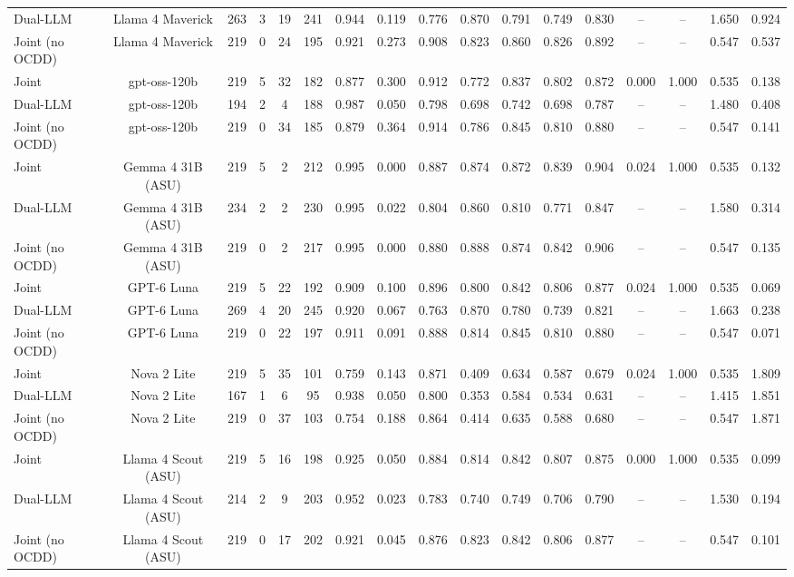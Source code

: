 \begin{table}[htbp]
\begin{tabular}{lcccccccccccccccc}
Dual-LLM & Llama 4 Maverick & 263 & 3 & 19 & 241 & 0.944 & 0.119 & 0.776 & 0.870 & 0.791 & 0.749 & 0.830 & -- & -- & 1.650 & 0.924 \\
Joint (no OCDD) & Llama 4 Maverick & 219 & 0 & 24 & 195 & 0.921 & 0.273 & 0.908 & 0.823 & 0.860 & 0.826 & 0.892 & -- & -- & 0.547 & 0.537 \\
Joint & gpt-oss-120b & 219 & 5 & 32 & 182 & 0.877 & 0.300 & 0.912 & 0.772 & 0.837 & 0.802 & 0.872 & 0.000 & 1.000 & 0.535 & 0.138 \\
Dual-LLM & gpt-oss-120b & 194 & 2 & 4 & 188 & 0.987 & 0.050 & 0.798 & 0.698 & 0.742 & 0.698 & 0.787 & -- & -- & 1.480 & 0.408 \\
Joint (no OCDD) & gpt-oss-120b & 219 & 0 & 34 & 185 & 0.879 & 0.364 & 0.914 & 0.786 & 0.845 & 0.810 & 0.880 & -- & -- & 0.547 & 0.141 \\
Joint & Gemma 4 31B (ASU) & 219 & 5 & 2 & 212 & 0.995 & 0.000 & 0.887 & 0.874 & 0.872 & 0.839 & 0.904 & 0.024 & 1.000 & 0.535 & 0.132 \\
Dual-LLM & Gemma 4 31B (ASU) & 234 & 2 & 2 & 230 & 0.995 & 0.022 & 0.804 & 0.860 & 0.810 & 0.771 & 0.847 & -- & -- & 1.580 & 0.314 \\
Joint (no OCDD) & Gemma 4 31B (ASU) & 219 & 0 & 2 & 217 & 0.995 & 0.000 & 0.880 & 0.888 & 0.874 & 0.842 & 0.906 & -- & -- & 0.547 & 0.135 \\
Joint & GPT-6 Luna & 219 & 5 & 22 & 192 & 0.909 & 0.100 & 0.896 & 0.800 & 0.842 & 0.806 & 0.877 & 0.024 & 1.000 & 0.535 & 0.069 \\
Dual-LLM & GPT-6 Luna & 269 & 4 & 20 & 245 & 0.920 & 0.067 & 0.763 & 0.870 & 0.780 & 0.739 & 0.821 & -- & -- & 1.663 & 0.238 \\
Joint (no OCDD) & GPT-6 Luna & 219 & 0 & 22 & 197 & 0.911 & 0.091 & 0.888 & 0.814 & 0.845 & 0.810 & 0.880 & -- & -- & 0.547 & 0.071 \\
Joint & Nova 2 Lite & 219 & 5 & 35 & 101 & 0.759 & 0.143 & 0.871 & 0.409 & 0.634 & 0.587 & 0.679 & 0.024 & 1.000 & 0.535 & 1.809 \\
Dual-LLM & Nova 2 Lite & 167 & 1 & 6 & 95 & 0.938 & 0.050 & 0.800 & 0.353 & 0.584 & 0.534 & 0.631 & -- & -- & 1.415 & 1.851 \\
Joint (no OCDD) & Nova 2 Lite & 219 & 0 & 37 & 103 & 0.754 & 0.188 & 0.864 & 0.414 & 0.635 & 0.588 & 0.680 & -- & -- & 0.547 & 1.871 \\
Joint & Llama 4 Scout (ASU) & 219 & 5 & 16 & 198 & 0.925 & 0.050 & 0.884 & 0.814 & 0.842 & 0.807 & 0.875 & 0.000 & 1.000 & 0.535 & 0.099 \\
Dual-LLM & Llama 4 Scout (ASU) & 214 & 2 & 9 & 203 & 0.952 & 0.023 & 0.783 & 0.740 & 0.749 & 0.706 & 0.790 & -- & -- & 1.530 & 0.194 \\
Joint (no OCDD) & Llama 4 Scout (ASU) & 219 & 0 & 17 & 202 & 0.921 & 0.045 & 0.876 & 0.823 & 0.842 & 0.806 & 0.877 & -- & -- & 0.547 & 0.101 \\
\bottomrule
\end{tabular}
\end{table}